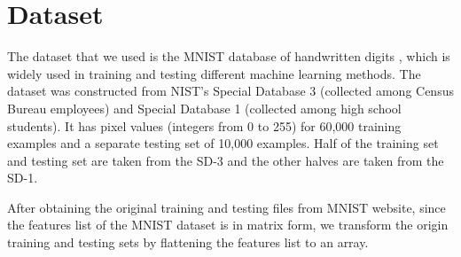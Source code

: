 \section{Dataset}
	The dataset that we used is the MNIST database of handwritten digits \cite{MNISTDatabase}, which is widely used in training and testing different machine learning methods. The dataset was constructed from NIST's Special Database 3 (collected among Census Bureau employees) and Special Database 1 (collected among high school students). It has pixel values (integers from 0 to 255) for 60,000 training examples and a separate testing set of 10,000 examples. Half of the training set and testing set are taken from the SD-3 and the other halves are taken from the SD-1.
	
	After obtaining the original training and testing files from MNIST website, since the features list of the MNIST dataset is in matrix form, we transform the origin training and testing sets by flattening the features list to an array. 